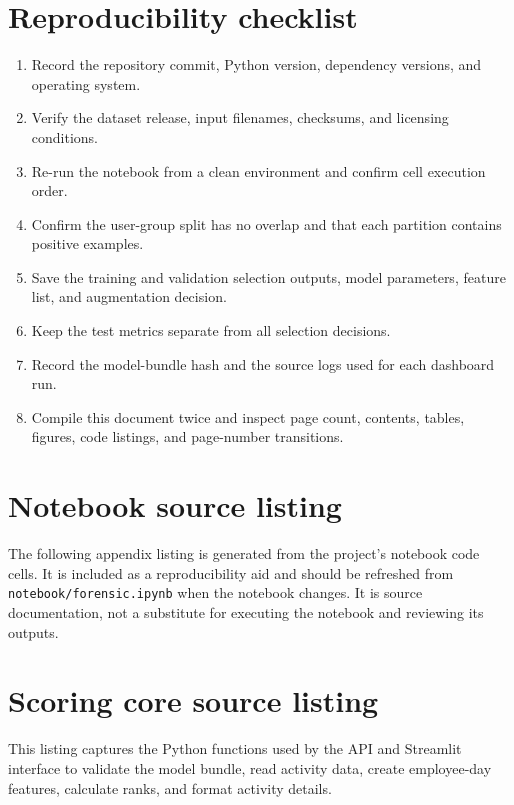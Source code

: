 \documentclass[12pt,a4paper,oneside]{report}
\newcommand{\code}[1]{\texttt{\small #1}}
\begin{document}
\section{Reproducibility checklist}
\begin{enumerate}
  \item Record the repository commit, Python version, dependency
  versions, and operating system.
  \item Verify the dataset release, input filenames, checksums, and
  licensing conditions.
  \item Re-run the notebook from a clean environment and confirm cell
  execution order.
  \item Confirm the user-group split has no overlap and that each
  partition contains positive examples.
  \item Save the training and validation selection outputs, model
  parameters, feature list, and augmentation decision.
  \item Keep the test metrics separate from all selection decisions.
  \item Record the model-bundle hash and the source logs used for each
  dashboard run.
  \item Compile this document twice and inspect page count, contents,
  tables, figures, code listings, and page-number transitions.
\end{enumerate}

\section{Notebook source listing}
\label{app:notebook-source}
The following appendix listing is generated from the project's
notebook code cells. It is included as a reproducibility aid and should
be refreshed from \code{notebook/forensic.ipynb} when the notebook
changes. It is source documentation, not a substitute for executing
the notebook and reviewing its outputs.

\clearpage


\section{Scoring core source listing}
\label{app:core-source}
This listing captures the Python functions used by the API and
Streamlit interface to validate the model bundle, read activity data,
create employee-day features, calculate ranks, and format activity
details.
\end{document}
